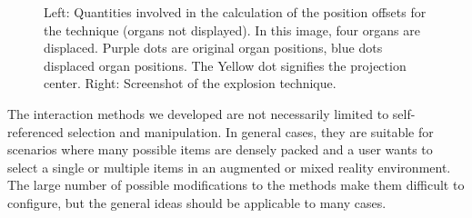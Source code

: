 \begin{figure}
	\caption[Organ Explosion]{Left: Quantities involved in the calculation of the position offsets for the technique (organs not displayed). In this image, four organs are displaced. Purple dots are original organ positions, blue dots displaced organ positions. The Yellow dot signifies the projection center. Right: Screenshot of the explosion technique.}
	\label{fig:3-IMR:organExplosion}
\end{figure}
The interaction methods we developed are not necessarily limited to self-referenced selection and manipulation. In general cases, they are suitable for scenarios where many possible items are densely packed and a user wants to select a single or multiple items in an augmented or mixed reality environment. The large number of possible modifications to the methods make them difficult to configure, but the general ideas should be applicable to many cases.

